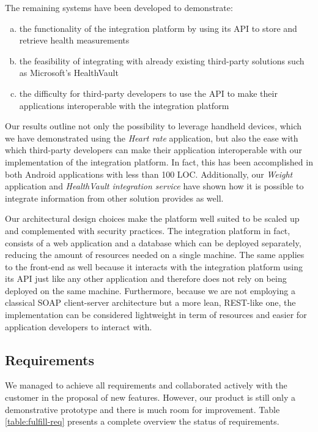 The remaining systems have been developed to demonstrate:
\begin{enumerate}[a.]
\item the functionality of the integration platform by using its API to store and retrieve health measurements
\item the feasibility of integrating with already existing third-party solutions such as Microsoft's HealthVault
\item the difficulty for third-party developers to use the API to make their applications interoperable with the integration platform
\end{enumerate}

Our results outline not only the possibility to leverage handheld devices, which we have demonstrated
using the \textit{Heart rate} application, but also the ease with which third-party developers can make
their application interoperable with our implementation of the integration platform.
In fact, this has been accomplished in both Android applications with less than 100 LOC.
Additionally, our \textit{Weight} application and \textit{HealthVault integration service} have shown how
it is possible to integrate information from other solution provides as well.

Our architectural design choices make the platform well suited to be scaled up and
complemented with security practices. The integration platform in fact, consists
of a web application and a database which can be deployed separately, reducing the amount of resources
needed on a single machine. The same applies to the front-end as well because it interacts with the
integration platform using its API just like any other application and therefore does not rely on being
deployed on the same machine. Furthermore, because we are not employing a classical SOAP client-server
architecture but a more lean, REST-like one, the implementation can be considered lightweight in term of
resources and easier for application developers to interact with.

\subsection{Requirements}

We managed to achieve all requirements and collaborated actively with the customer in the proposal
of new features. However, our product is still only a demonstrative prototype and there is
much room for improvement. Table \ref{table:fulfill-req} presents a complete overview the status of requirements.

